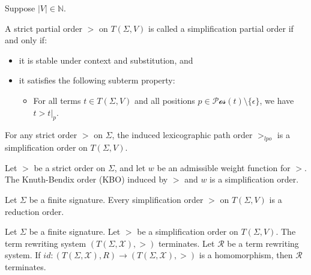 Suppose $|V| \in \mathbb{N}$.
    
\begin{definition}
A strict partial order $>$ on $T(\Sigma,V)$ is called a simplification partial order if and only if:
\begin{itemize}
    \item it is stable under context and substitution, and
    \item it satisfies the following subterm property:
    \begin{itemize}
        \item For all terms $t \in T(\Sigma,V)$ and all positions $p \in \mathcal{Pos}(t) \setminus \{\epsilon\}$, we have $t > t|_p$.
    \end{itemize}
\end{itemize}  
\end{definition}

\begin{proposition}
For any strict order $>$ on $\Sigma$, the induced lexicographic path order $>_{lpo}$ is a simplification order on $T(\Sigma,V)$.
\end{proposition}
    
\begin{proposition}
Let $>$ be a strict order on $\Sigma$, and let $w$ be an admissible weight function for $>$. The Knuth-Bendix order (KBO) induced by $>$ and $w$ is a simplification order.
\end{proposition}
    
\begin{theorem}
Let $\Sigma$ be a finite signature. Every simplification order $>$ on $T(\Sigma,V)$ is a reduction order.
\end{theorem}

\begin{corollary}
  Let $\Sigma$ be a finite signature. Let $>$ be a simplification order on $T(\Sigma,V)$. The term rewriting system $(T(\Sigma,\mathcal{X}),>)$ terminates. Let $\mathcal{R}$ be a term rewriting system. If $id : (T(\Sigma,\mathcal{X}),R) \to  (T(\Sigma,\mathcal{X}),>)$ is a homomorphism, then $\mathcal{R}$ terminates.
\end{corollary}